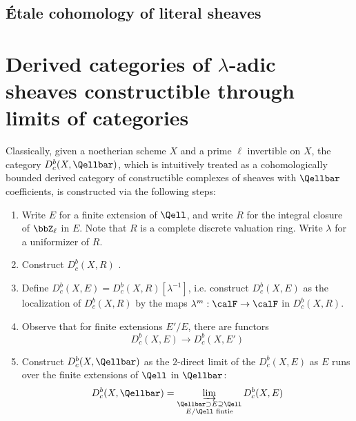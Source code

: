 \subsection{\'Etale cohomology of literal sheaves}







\section{Derived categories of \texorpdfstring{$\lambda$}{lambad}-adic sheaves constructible through limits of categories}


Classically, given a noetherian scheme $X$ and a prime $\ell$ invertible on $X$, the category $D_c^b(X, \Qellbar)$, which is intuitively treated as a cohomologically bounded derived category of constructible complexes of sheaves with $\Qellbar$ coefficients, is constructed via the following steps:

\begin{enumerate}
    \item 

    Write $E$ for a finite extension of $\Qell$, and write $R$ for the integral closure of $\bbZ_\ell$ in $E$. Note that $R$ is a complete discrete valuation ring. Write $\lambda$ for a uniformizer of $R$. 
    \item Construct $D_c^b(X,R)$ .
    \item Define $D_c^b(X,E) = D_c^b(X,R)[\lambda^{-1}]$, i.e. construct $D_c^b(X,E)$ as the localization of $D_c^b(X,R)$ by the maps $\lambda^m: \calF \to \calF$ in $D_c^b(X,R)$.
    \item Observe that for finite extensions $E'/E$, there are functors 
    $$D_c^b(X,E) \to D_c^b(X,E')$$
    \item Construct $D_c^b(X, \Qellbar)$ as the $2$-direct limit of the $D_c^b(X,E)$ as $E$ runs over the finite extensions of $\Qell$ in $\Qellbar$:
    $$D_c^b(X, \Qellbar) = \varinjlim_{\substack{\Qellbar \supset E \supseteq \Qell \\ E/\Qell \text{ fintie}}} D_c^b(X,E)$$
\end{enumerate}


